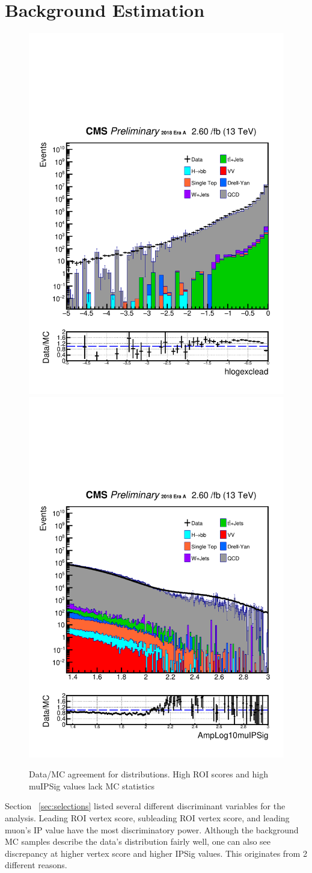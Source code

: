\clearpage
\chapter{Background Estimation}\label{sec:estimate}

\begin{figure}[h!]
  \caption{Data/MC agreement for distributions. High ROI scores and high muIPSig values lack MC statistics}
  \label{fig:DataMCscore5}
  \centering
  \includegraphics[width=0.40\linewidth]{figs/Data_log_AnalysisNote_MS-15_ctauS-10_hlogexclead.pdf}
  \includegraphics[width=0.40\linewidth]{figs/Data_log_AnalysisNote_MS-15_ctauS-10_AmpLog10muIPSig.pdf}

\end{figure}
Section ~\ref{sec:selections} listed several different discriminant variables for the analysis.
Leading ROI vertex score, subleading ROI vertex score, and leading muon's IP value have the most discriminatory power.
Although the background MC samples describe the data's distribution fairly well, one can also see discrepancy at higher vertex score and higher IPSig values.
This originates from 2 different reasons.
